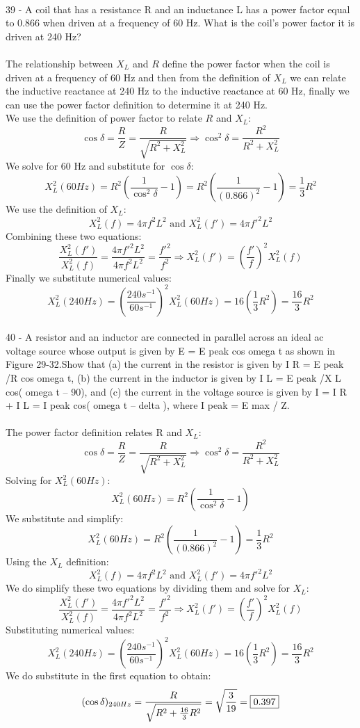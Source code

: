 \documentclass{report}
\begin{document}
\paragraph{}
39 - A coil that has a resistance R and an inductance L has a power factor equal to 0.866 when driven at a frequency of 60 Hz. What is the coil’s power factor it is driven at 240 Hz?\\
\\
The relationship between $X_L$ and $R$ define the power factor when the coil is driven at a frequency of 60 Hz and then from the definition of $X_L$ we can relate the inductive reactance at 240 Hz to the inductive reactance at 60 Hz, finally we can use the power factor definition to determine it at 240 Hz.\\
We use the definition of power factor to relate $R$ and $X_L$:
$$\cos \delta = \frac{R}{Z} = \frac{R}{\sqrt{R^2 + X_L^2}} \Rightarrow \cos^2 \delta = \frac{R^2}{R^2 + X_L^2}$$
We solve for 60 Hz and substitute for $\cos \delta$:
$$X_L^2(60Hz) = R^2\left( \frac{1}{\cos^2 \delta} - 1 \right) = R^2\left( \frac{1}{(0.866)^2} - 1 \right) = \frac{1}{3}R^2$$
We use the definition of $X_L$:
$$X_L^2(f) = 4\pi f^2L^2 \text{ and } X_L^2(f') = 4\pi f'^2L^2$$
Combining these two equations:
$$\frac{X_L^2(f')}{X_L^2(f)} = \frac{4\pi f'^2L^2}{4\pi f^2L^2} = \frac{f'^2}{f^2} \Rightarrow X_L^2(f') = \left( \frac{f'}{f} \right)^2X_L^2(f)$$
Finally we substitute numerical values:
$$X_L^2(240Hz) = \left( \frac{240s^{-1}}{60s^{-1}} \right)^2 X_L^2(60Hz) = 16\left( \frac{1}{3}R^2 \right) = \frac{16}{3}R^2$$

\paragraph{}
40 - A resistor and an inductor are connected in parallel across an ideal ac voltage source whose output is given by E = E peak cos omega t as shown in Figure 29-32.Show that (a) the current in the resistor is given by I R = E peak /R cos omega t, (b) the current in the inductor is given by I L = E peak /X L cos( omega t – 90), and (c) the current in the voltage source is given by I = I R + I L = I peak cos( omega t – delta ), where I peak = E max / Z.\\
\\
The power factor definition relates R and $X_L$:
$$\cos \delta = \frac{R}{Z} = \frac{R}{\sqrt{R^2 + X_L^2}} \Rightarrow \cos^2 \delta = \frac{R^2}{R^2 + X_L^2}$$
Solving for $X_L^2(60Hz)$:
$$X_L^2(60Hz) = R^2 \left( \frac{1}{\cos^2 \delta} - 1\right)$$
We substitute and simplify:
$$X_L^2(60Hz) = R^2 \left( \frac{1}{(0.866)^2} - 1\right) = \frac{1}{3}R^2$$
Using the $X_L$ definition:
$$X_L^2(f) = 4\pi f^2L^2 \text{ and } X_L^2(f') = 4\pi f'^2L^2$$
We do simplify these two equations by dividing them and solve for $X_L$:
$$\frac{X_L^2(f')}{X_L^2(f)} =  \frac{4\pi f'^2L^2}{4\pi f^2L^2} = \frac{f'^2}{f^2} \Rightarrow X_L^2(f') = \left( \frac{f'}{f} \right)^2X_L^2(f)$$
Substituting numerical values:
$$X_L^2(240Hz) = \left( \frac{240s^{-1}}{60s^{-1}} \right)^2 X_L^2(60Hz) = 16 \left( \frac{1}{3}R^2 \right) = \frac{16}{3}R^2$$
We do substitute in the first equation to obtain:
$$(\cos \delta)_{240Hz} = \frac{R}{\sqrt{R^2 + \frac{16}{3}R^2}} = \sqrt{\frac{3}{19}} = \fbox{0.397}$$
\end{document}
